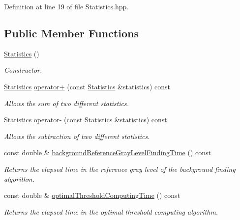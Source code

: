 Definition at line 19 of file Statistics.hpp.\subsection*{Public Member Functions}
\begin{CompactItemize}
\item 
\hyperlink{class_statistics_60ddd90a571ed4c3ce8c0f6317a36d63}{Statistics} ()
\begin{CompactList}\small\item\em Constructor. \item\end{CompactList}\item 
\hyperlink{class_statistics}{Statistics} \hyperlink{class_statistics_cb07c98a63e07fdb1476ffb282b84676}{operator+} (const \hyperlink{class_statistics}{Statistics} \&statistics) const 
\begin{CompactList}\small\item\em Allows the sum of two different statistics. \item\end{CompactList}\item 
\hyperlink{class_statistics}{Statistics} \hyperlink{class_statistics_529bed34d909d88440214d6983779043}{operator-} (const \hyperlink{class_statistics}{Statistics} \&statistics) const 
\begin{CompactList}\small\item\em Allows the subtraction of two different statistics. \item\end{CompactList}\item 
const double \& \hyperlink{class_statistics_d70a464a72d94c795097608e2a18550a}{backgroundReferenceGrayLevelFindingTime} () const 
\begin{CompactList}\small\item\em Returns the elapsed time in the reference gray level of the background finding algorithm. \item\end{CompactList}\item 
const double \& \hyperlink{class_statistics_87bdb5b4f7a88cb74d0072fd0c7a2248}{optimalThresholdComputingTime} () const 
\begin{CompactList}\small\item\em Returns the elapsed time in the optimal threshold computing algorithm. \item\end{CompactList}\item 

\end{CompactItemize}
